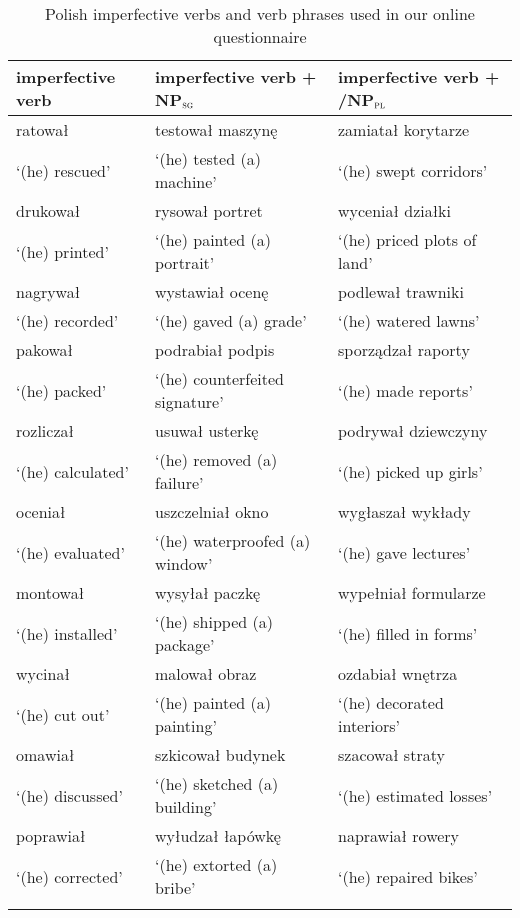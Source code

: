 \documentclass[output=paper]{langscibook}
\begin{document}
\begin{table}
\caption{Polish imperfective verbs and verb phrases used in our online questionnaire}
\label{jan-bla:fansb:kb:tab2}
 \begin{tabularx}{\textwidth}{lll}
  \lsptoprule
            imperfective verb  &    imperfective verb + NP$_\textsc{sg}$     & imperfective verb + /NP$_\textsc{pl}$\\
  \midrule
    ratował  &    testował maszynę  & zamiatał korytarze \\
    ‘(he) rescued' &    ‘(he) tested (a) machine'    & ‘(he) swept corridors'\\\tablevspace
     drukował  &   rysował portret  & wyceniał działki \\
    ‘(he) printed' &    ‘(he) painted (a) portrait'    & ‘(he) priced plots of land'\\\tablevspace
     nagrywał  &   wystawiał ocenę  & podlewał trawniki \\
    ‘(he) recorded' &    ‘(he) gaved (a) grade'    & ‘(he) watered lawns'\\\tablevspace
     pakował  &   podrabiał podpis  & sporządzał raporty \\
    ‘(he) packed' &    ‘(he) counterfeited signature'    & ‘(he) made reports'\\\tablevspace
     rozliczał  &   usuwał usterkę  & podrywał dziewczyny \\
    ‘(he) calculated' &  ‘(he) removed (a) failure'    & ‘(he) picked up girls'\\\tablevspace
     oceniał  &   uszczelniał okno  & wygłaszał wykłady \\
    ‘(he) evaluated' &  ‘(he) waterproofed (a) window'    & ‘(he) gave lectures'\\\tablevspace
    montował  &   wysyłał paczkę  & wypełniał formularze \\
    ‘(he) installed' &  ‘(he) shipped (a) package'    & ‘(he) filled in forms'\\\tablevspace
    wycinał  &   malował obraz  & ozdabiał wnętrza \\
    ‘(he) cut out' &  ‘(he) painted (a) painting'    & ‘(he) decorated interiors'\\\tablevspace
    omawiał  &   szkicował budynek  & szacował straty \\
    ‘(he) discussed' &  ‘(he) sketched (a) building'    & ‘(he) estimated losses'\\\tablevspace
    poprawiał  &   wyłudzał łapówkę  & naprawiał rowery \\
    ‘(he) corrected' &  ‘(he) extorted (a) bribe'    & ‘(he) repaired bikes'\\
  \lspbottomrule
 \end{tabularx}
\end{table}
\end{document}
